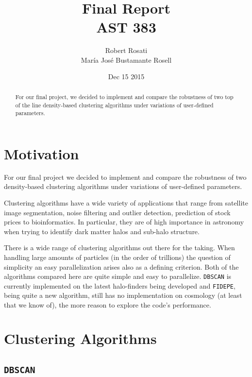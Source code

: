 \documentclass[12pt]{article}
\begin{document}
\singlespacing
\title{Final Report\\
AST 383}
\date{Dec 15 2015}
\author{Robert Rosati \\ Mar\'{i}a Jos\'{e} Bustamante Rosell}
\maketitle

\begin{abstract}
\par For our final project, we decided to implement and compare the robustness of two top of the line density-based clustering algorithms under variations of user-defined parameters.
\end{abstract}

\doublespacing
\section{Motivation}

\par For our final project we decided to implement and compare the robustness of two density-based clustering algorithms under variations of user-defined parameters. 
\par Clustering algorithms have a wide variety of applications that range from satellite image segmentation, noise filtering and outlier detection, prediction of stock prices to bioinformatics. In particular, they are of high importance in astronomy when trying to identify dark matter halos and sub-halo structure.
\par There is a wide range of clustering algorithms out there for the taking. When handling large amounts of particles (in the order of trillions) the question of simplicity an easy parallelization arises also as a defining criterion. Both of the algorithms compared here are quite simple and easy to parallelize. \texttt{DBSCAN} is currently implemented on the latest halo-finders being developed \cite{BDCATS} and \texttt{FIDEPE}, being quite a new algorithm, still has no implementation on cosmology (at least that we know of), the more reason to explore the code's performance.

\section{Clustering Algorithms}



\subsection{\texttt{DBSCAN}}
\end{document}

